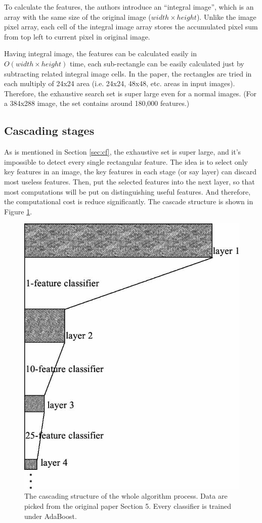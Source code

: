 \documentclass[10pt,twocolumn,letterpaper]{article}
\begin{document}
To calculate the features, the authors introduce an ``integral image'', which is an array with the same size of the original image ($width \times height$).
Unlike the image pixel array, each cell of the integral image array stores the accumulated pixel sum from top left to current pixel in original image.

Having integral image, the features can be calculated easily in $O(width \times height)$ time,
each sub-rectangle can be easily calculated just by subtracting related integral image cells.
In the paper, the rectangles are tried in each multiply of 24x24 area (i.e. 24x24, 48x48, etc. areas in input images).
Therefore, the exhaustive search set is super large even for a normal images. (For a 384x288 image, the set contains around 180,000 features.)

\subsection{Cascading stages}
As is mentioned in Section \ref{sec:cf}, the exhaustive set is super large, and it's impossible to detect every single rectangular feature.
The idea is to select only key features in an image, the key features in each stage (or say layer) can discard most useless features.
Then, put the selected features into the next layer, so that most computations will be put on distinguishing useful features.
And therefore, the computational cost is reduce significantly. The cascade structure is shown in Figure \ref{fig:cs}.

\begin{figure}[t]
    \begin{center}
        \includegraphics[width=0.8\linewidth]{cascading}
    \end{center}
    \caption{The cascading structure of the whole algorithm process. Data are picked from the original paper Section 5. Every classifier is trained under AdaBoost.}
    \label{fig:cs}
\end{figure}
\end{document}
